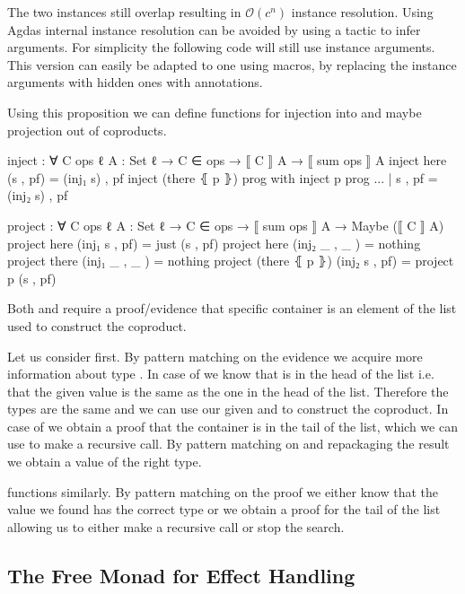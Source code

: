 The two instances still overlap resulting in $\mathcal{O}(c^n)$ instance
resolution.
Using Agdas internal instance resolution can be avoided by using a tactic to
infer  arguments.
For simplicity the following code will still use instance arguments.
This version can easily be adapted to one using macros, by replacing the
instance arguments with hidden ones with  annotations.

Using this proposition we can define functions for injection into and maybe projection
out of coproducts.

\begin{code}
inject : ∀ {C ops ℓ} {A : Set ℓ} → C ∈ ops → ⟦ C ⟧ A → ⟦ sum ops ⟧ A
inject here           (s , pf)  = (inj₁ s) , pf
inject (there ⦃ p ⦄)  prog      with inject p prog
... | s , pf = (inj₂ s) , pf

project : ∀ {C ops ℓ} {A : Set ℓ} → C ∈ ops → ⟦ sum ops ⟧ A → Maybe (⟦ C ⟧ A)
project here           (inj₁ s , pf)  = just (s , pf)
project here           (inj₂ _ , _ )  = nothing
project there          (inj₁ _ , _ )  = nothing
project (there ⦃ p ⦄)  (inj₂ s , pf)  = project p (s , pf)
\end{code}
Both  and  require a proof/evidence
that specific container is an element of the list used to construct the
coproduct.

Let us consider  first.
By pattern matching on the evidence we acquire more information about type 
\AgdaSpace{}.
In case of  we know that  is in
the head of the list i.e. that the given value 
is the same as the one in the head of the list.
Therefore the  types are the same and we can use our given
 and  to construct the coproduct.
In case of  we obtain a proof that the container
is in the tail of the list, which we can use to make a recursive call.
By pattern matching on and repackaging the result we obtain a value of the right
type.

 functions similarly.
By pattern matching on the proof we either know that the value we found has
the correct type or we obtain a proof for the tail of the list allowing us to
either make a recursive call or stop the search.


\subsection{The Free Monad for Effect Handling}
\label{first-order:free-monad}

